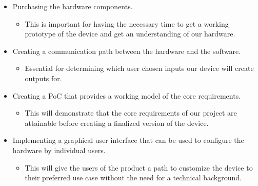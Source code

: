 \documentclass{article}
\begin{document}
\begin{itemize}
	\item Purchasing the hardware components.
	\begin{itemize}
		\item This is important for having the necessary time to get a working prototype of the device and get an understanding of our hardware. 
	\end{itemize}
\end{itemize}

\begin{itemize}
	\item Creating a communication path between the hardware and the software.
	\begin{itemize}
		\item Essential for determining which user chosen inputs our device will create outputs for. 
	\end{itemize}
\end{itemize}

\begin{itemize}
	\item Creating a PoC that provides a working model of the core requirements.
	\begin{itemize}
		\item This will demonstrate that the core requirements of our project are attainable before creating a finalized version of the device. 
	\end{itemize}
\end{itemize}

\begin{itemize}
	\item Implementing a graphical user interface that can be used to configure the hardware by individual users.
	\begin{itemize}
		\item This will give the users of the product a path to customize the device to their preferred use case without the need for a technical background. 
	\end{itemize}
\end{itemize}
\end{document}
